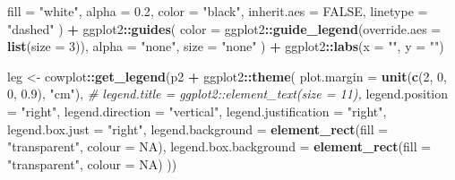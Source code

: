 \documentclass[
]{book}
\newenvironment{Shaded}{\begin{snugshade}}{\end{snugshade}}
\newcommand{\AttributeTok}[1]{\textcolor[rgb]{0.13,0.29,0.53}{#1}}
\newcommand{\CommentTok}[1]{\textcolor[rgb]{0.56,0.35,0.01}{\textit{#1}}}
\newcommand{\ConstantTok}[1]{\textcolor[rgb]{0.56,0.35,0.01}{#1}}
\newcommand{\DecValTok}[1]{\textcolor[rgb]{0.00,0.00,0.81}{#1}}
\newcommand{\FloatTok}[1]{\textcolor[rgb]{0.00,0.00,0.81}{#1}}
\newcommand{\FunctionTok}[1]{\textcolor[rgb]{0.13,0.29,0.53}{\textbf{#1}}}
\newcommand{\NormalTok}[1]{#1}
\newcommand{\OtherTok}[1]{\textcolor[rgb]{0.56,0.35,0.01}{#1}}
\newcommand{\SpecialCharTok}[1]{\textcolor[rgb]{0.81,0.36,0.00}{\textbf{#1}}}
\newcommand{\StringTok}[1]{\textcolor[rgb]{0.31,0.60,0.02}{#1}}
\begin{document}
\begin{Shaded}
\begin{Highlighting}[]
    \AttributeTok{fill =} \StringTok{"white"}\NormalTok{,}
    \AttributeTok{alpha =} \FloatTok{0.2}\NormalTok{,}
    \AttributeTok{color =} \StringTok{"black"}\NormalTok{,}
    \AttributeTok{inherit.aes =} \ConstantTok{FALSE}\NormalTok{,}
    \AttributeTok{linetype =} \StringTok{"dashed"}
\NormalTok{  ) }\SpecialCharTok{+}
\NormalTok{  ggplot2}\SpecialCharTok{::}\FunctionTok{guides}\NormalTok{(}
    \AttributeTok{color =}\NormalTok{ ggplot2}\SpecialCharTok{::}\FunctionTok{guide\_legend}\NormalTok{(}\AttributeTok{override.aes =} \FunctionTok{list}\NormalTok{(}\AttributeTok{size =} \DecValTok{3}\NormalTok{)),}
    \AttributeTok{alpha =} \StringTok{"none"}\NormalTok{,}
    \AttributeTok{size =} \StringTok{"none"}
\NormalTok{  ) }\SpecialCharTok{+}
\NormalTok{  ggplot2}\SpecialCharTok{::}\FunctionTok{labs}\NormalTok{(}\AttributeTok{x =} \StringTok{""}\NormalTok{, }\AttributeTok{y =} \StringTok{""}\NormalTok{)}

\NormalTok{leg }\OtherTok{\textless{}{-}}\NormalTok{ cowplot}\SpecialCharTok{::}\FunctionTok{get\_legend}\NormalTok{(p2 }\SpecialCharTok{+}
\NormalTok{                             ggplot2}\SpecialCharTok{::}\FunctionTok{theme}\NormalTok{(}
                               \AttributeTok{plot.margin =} \FunctionTok{unit}\NormalTok{(}\FunctionTok{c}\NormalTok{(}\DecValTok{2}\NormalTok{, }\DecValTok{0}\NormalTok{, }\DecValTok{0}\NormalTok{, }\FloatTok{0.9}\NormalTok{), }\StringTok{"cm"}\NormalTok{),}
                               \CommentTok{\# legend.title = ggplot2::element\_text(size = 11),}
                               \AttributeTok{legend.position =} \StringTok{"right"}\NormalTok{,}
                               \AttributeTok{legend.direction =} \StringTok{"vertical"}\NormalTok{,}
                               \AttributeTok{legend.justification =} \StringTok{"right"}\NormalTok{,}
                               \AttributeTok{legend.box.just =} \StringTok{"right"}\NormalTok{,}
                               \AttributeTok{legend.background =} \FunctionTok{element\_rect}\NormalTok{(}\AttributeTok{fill =} \StringTok{"transparent"}\NormalTok{, }\AttributeTok{colour =} \ConstantTok{NA}\NormalTok{),}
                               \AttributeTok{legend.box.background =} \FunctionTok{element\_rect}\NormalTok{(}\AttributeTok{fill =} \StringTok{"transparent"}\NormalTok{, }\AttributeTok{colour =} \ConstantTok{NA}\NormalTok{)}
\NormalTok{                             ))}


\end{Highlighting}
\end{Shaded}
\end{document}
